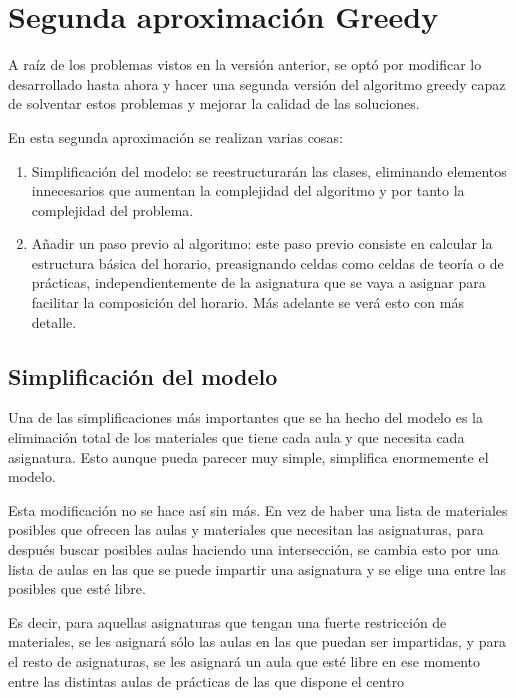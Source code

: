 \chapter{Segunda aproximación Greedy}

A raíz de los problemas vistos en la versión anterior, se optó por modificar lo desarrollado hasta ahora y hacer una segunda versión del algoritmo greedy capaz de solventar estos problemas y mejorar la calidad de las soluciones. 

En esta segunda aproximación se realizan varias cosas:

\begin{enumerate}
  \item Simplificación del modelo: se reestructurarán las clases, eliminando elementos innecesarios que aumentan la complejidad del algoritmo y por tanto la complejidad del problema. 
  \item Añadir un paso previo al algoritmo: este paso previo consiste en calcular la estructura básica del horario, preasignando celdas como celdas de teoría o de prácticas, independientemente de la asignatura que se vaya a asignar para facilitar la composición del horario. Más adelante se verá esto con más detalle.
\end{enumerate}

\section{Simplificación del modelo}

Una de las simplificaciones más importantes que se ha hecho del modelo es la eliminación total de los materiales que tiene cada aula y que necesita cada asignatura. Esto aunque pueda parecer muy simple, simplifica enormemente el modelo. 

Esta modificación no se hace así sin más. En vez de haber una lista de materiales posibles que ofrecen las aulas y materiales que necesitan las asignaturas, para después buscar posibles aulas haciendo una intersección, se cambia esto por una lista de aulas en las que se puede impartir una asignatura y se elige una entre las posibles que esté libre. 

Es decir, para aquellas asignaturas que tengan una fuerte restricción de materiales, se les asignará sólo las aulas en las que puedan ser impartidas, y para el resto de asignaturas, se les asignará un aula que esté libre en ese momento entre las distintas aulas de prácticas de las que dispone el centro

